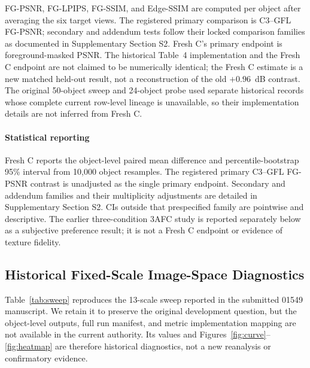 \documentclass[times,twocolumn,final]{elsarticle}
\providecommand{\DIFadd}[1]{{\protect\color{blue} \sf #1}} %
\providecommand{\DIFaddbegin}{} %
\providecommand{\DIFaddend}{} %
\begin{document}
  \DIFaddbegin \DIFadd{FG-PSNR, FG-LPIPS, FG-SSIM, and Edge-SSIM are computed per object after averaging the six target views. The registered primary comparison is C3--GFL FG-PSNR; secondary and addendum tests follow their locked comparison families as documented in Supplementary Section S2. Fresh C's primary endpoint is }\DIFaddend foreground-masked   \DIFaddbegin \DIFadd{PSNR. The historical Table~4 implementation and the Fresh C endpoint are not claimed to be numerically identical; the Fresh C estimate is a new matched held-out result, not a reconstruction of the old $+0.96$~dB contrast. The original 50-object sweep and 24-object probe used separate historical records whose complete current row-level lineage is unavailable, so their implementation details are not inferred from Fresh C}\DIFaddend .

\paragraph{Statistical reporting}
  \DIFaddbegin \DIFadd{Fresh C reports the object-level paired mean difference and percentile-bootstrap }\DIFaddend 95\%   \DIFaddbegin \DIFadd{interval from }\DIFaddend 10{,}000   \DIFaddbegin \DIFadd{object resamples. The registered primary C3--GFL FG-PSNR contrast is unadjusted as the single primary endpoint. Secondary and addendum families and their multiplicity adjustments are detailed in Supplementary Section S2. CIs outside that prespecified family are pointwise and descriptive. The earlier three-condition 3AFC study is reported separately below as a subjective preference result; it is not a Fresh C endpoint or evidence of texture fidelity}\DIFaddend .

  \DIFaddbegin \subsection{Historical Fixed-Scale Image-Space Diagnostics}
\DIFaddend \label{subsec:tradeoff}

Table~\ref{tab:sweep}   \DIFaddbegin \DIFadd{reproduces the }\DIFaddend 13-scale   \DIFaddbegin \DIFadd{sweep reported in the submitted 01549 manuscript. We retain it to preserve the original development question, but the object-level outputs, full run manifest, and metric implementation mapping are not available in the current authority. Its values and Figures~\ref{fig:curve}--\ref{fig:heatmap} are therefore historical diagnostics, not a new reanalysis or confirmatory evidence}\DIFaddend .
\end{document}
